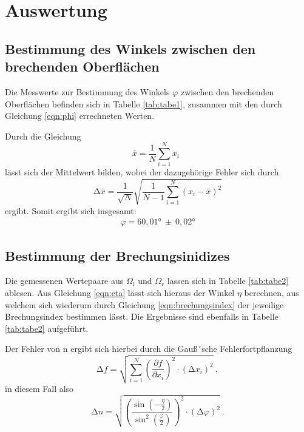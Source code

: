 \section{Auswertung}
\label{sec:Auswertung}
\subsection{Bestimmung des Winkels zwischen den brechenden Oberflächen}

Die Messwerte zur Bestimmung des Winkels $\varphi$ zwischen den brechenden Oberflächen befinden sich
in Tabelle \ref{tab:tabe1},
zusammen mit den durch Gleichung \ref{eqn:phi} errechneten Werten.


Durch die Gleichung
\begin{equation}
  \bar{x} = \frac{1}{N} \sum_{i=1}^{N} x_i \: \:
  \label{eqn:mit}
\end{equation}
\noindent lässt sich der Mittelwert bilden, wobei der dazugehörige Fehler sich durch
\begin{equation}
  \increment \bar{x} = \frac{1}{\sqrt{N}} \sqrt{ \frac{1}{N-1} \sum_{i=1}^N
  (x_i - \bar{x})^2}
  \label{eqn:mitf}
\end{equation}
ergibt. Somit ergibt sich insgesamt:
\begin{align*}
  \varphi = 60,01° \: \pm \: 0,02 °
\end{align*}
\subsection{Bestimmung der Brechungsinidizes}
Die gemessenen Wertepaare aus $\Omega_{l}$ und $\Omega_{r}$ lassen sich in Tabelle \ref{tab:tabe2}
ablesen. Aus Gleichung \ref{eqn:eta} lässt sich hieraus der Winkel $\eta$ berechnen, aus welchem sich
wiederum durch Gleichung \ref{eqn:brechungsindex} der jeweilige Brechungsindex bestimmen lässt.
Die Ergebnisse sind ebenfalls in Tabelle \ref{tab:tabe2} aufgeführt.

Der Fehler von n ergibt sich hierbei durch die Gauß´sche Fehlerfortpflanzung
\begin{equation}
  \increment f = \sqrt{ \sum_{i=1}^N \left( \frac{\partial f}{\partial x_i}\right)^2
  \cdot (\increment x_i)^2  } \: ,
  \label{eqn:gaus}
\end{equation}
in diesem Fall also
\begin{equation}
  \increment n = \sqrt{ \left( \frac{ \sin(-\frac{\eta}{2})}{\sin^2(\frac{\varphi}{2})} \right)^2
  \cdot (\increment \varphi)^2 } \: .
\end{equation}

